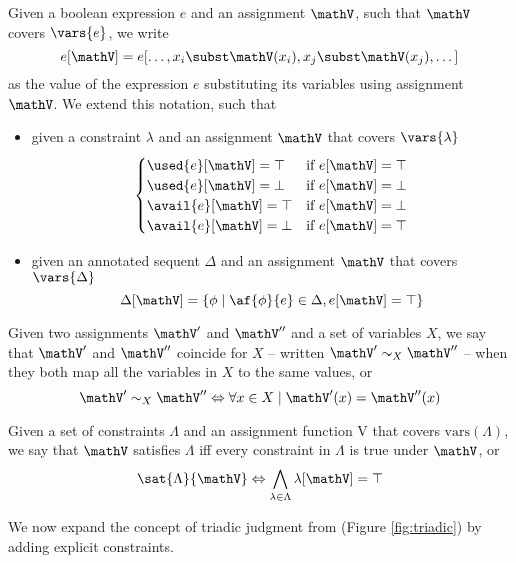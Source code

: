 \begin{define}[Evaluation]
	\label{def:evaluation}
	Given a boolean expression $e$ and an assignment $\mathV$, such that $\mathV$ covers $\vars{e}$, we write
		$$ e[\mathV] = e[\dots, x_i \subst \mathV(x_i), x_j \subst \mathV(x_j), \dots] $$
	as the value of the expression $e$ substituting its variables using assignment $\mathV$.
	We extend this notation, such that
	\begin{itemize}
		\item given a constraint $\lambda$ and an assignment $\mathV$ that covers $\vars{\lambda}$
			$$ 
			\begin{cases} 
				\used{e}[\mathV] = \top & \text{if } e[\mathV] = \top \\
				\used{e}[\mathV] = \bot & \text{if } e[\mathV] = \bot \\
				\avail{e}[\mathV] = \top & \text{if } e[\mathV] = \bot \\
				\avail{e}[\mathV] = \bot & \text{if } e[\mathV] = \top \\
			\end{cases}
			$$
		\item given an annotated sequent $\Delta$ and an assignment $\mathV$ that covers $\vars{\Delta}$
			$$ \Delta[\mathV] = \{ \phi \mid \af{\phi}{e} \in \Delta , e[\mathV] = \top \} $$
	\end{itemize}
\end{define}
\begin{define}
	\label{def:coincidence}
	Given two assignments $\mathV'$ and $\mathV''$ and a set of variables $X$, we say that $\mathV'$ and $\mathV''$ coincide for $X$ -- written $\mathV' \sim_X \mathV''$ -- when they both map all the variables in $X$ to the same values, or
	$$ \mathV' \sim_X \mathV'' \Leftrightarrow \forall x \in X \mid \mathV'(x) = \mathV''(x) $$
\end{define}
\begin{define}[Satisfaiability]
	\label{def:sat}
	Given a set of constraints $\Lambda$ and an assignment function V that covers $\mathrm{vars}(\Lambda)$, we say that $\mathV$ satisfies $\Lambda$ iff every constraint in $\Lambda$ is true under $\mathV$, or
	$$ \sat{\Lambda}{\mathV} \Leftrightarrow \bigwedge_{\lambda \in \Lambda} \lambda[\mathV] = \top $$
\end{define}
We now expand the concept of triadic judgment from \cite{Focusing} (Figure \ref{fig:triadic}) by adding explicit constraints.
